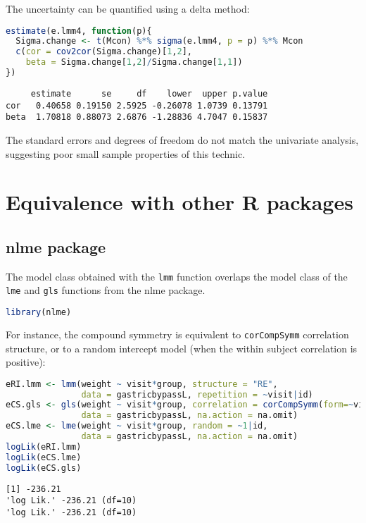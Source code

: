 \documentclass[12pt]{article}
\begin{document}
The uncertainty can be quantified using a delta method:
\begin{lstlisting}[language=r,numbers=none]
estimate(e.lmm4, function(p){
  Sigma.change <- t(Mcon) %*% sigma(e.lmm4, p = p) %*% Mcon
  c(cor = cov2cor(Sigma.change)[1,2],
    beta = Sigma.change[1,2]/Sigma.change[1,1])
})
\end{lstlisting}

\label{}
\begin{verbatim}
     estimate      se     df    lower  upper p.value
cor   0.40658 0.19150 2.5925 -0.26078 1.0739 0.13791
beta  1.70818 0.88073 2.6876 -1.28836 4.7047 0.15837
\end{verbatim}


The standard errors and degrees of freedom do not match the univariate
analysis, suggesting poor small sample properties of this
technic.

\clearpage
\section{Equivalence with other R packages}
\label{sec:org4c39a04}

\subsection{nlme package}
\label{sec:orgd092264}

The model class obtained with the \texttt{lmm} function overlaps the model
class of the \texttt{lme} and \texttt{gls} functions from the nlme package.
\begin{lstlisting}[language=r,numbers=none]
library(nlme)
\end{lstlisting}

For instance, the compound symmetry is equivalent to \texttt{corCompSymm}
correlation structure, or to a random intercept model (when the within
subject correlation is positive):
\begin{lstlisting}[language=r,numbers=none]
eRI.lmm <- lmm(weight ~ visit*group, structure = "RE",
               data = gastricbypassL, repetition = ~visit|id)
eCS.gls <- gls(weight ~ visit*group, correlation = corCompSymm(form=~visit|id),
               data = gastricbypassL, na.action = na.omit)
eCS.lme <- lme(weight ~ visit*group, random = ~1|id,
               data = gastricbypassL, na.action = na.omit)
logLik(eRI.lmm)
logLik(eCS.lme)
logLik(eCS.gls)
\end{lstlisting}

\label{}
\begin{verbatim}
[1] -236.21
'log Lik.' -236.21 (df=10)
'log Lik.' -236.21 (df=10)
\end{verbatim}
\end{document}
